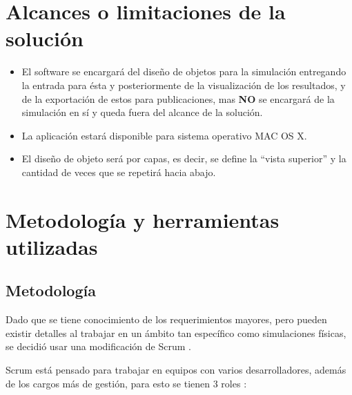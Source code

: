 \section{Alcances o limitaciones de la solución}
\begin{itemize}
	\item El software se encargará del diseño de objetos para la simulación entregando la entrada para ésta y posteriormente de la visualización de los resultados, y de la exportación de estos para publicaciones, mas \textbf{NO} se encargará de la simulación en sí y queda fuera del alcance de la solución.
	\item La aplicación estará disponible para sistema operativo MAC OS X.
	\item El diseño de objeto será por capas, es decir, se define la ``vista superior'' y la cantidad de veces que se repetirá hacia abajo.
\end{itemize}


\section{Metodolog\'ia y herramientas utilizadas}
\label{intro:metodologia}

\subsection{Metodolog\'ia}
Dado que se tiene conocimiento de los requerimientos mayores, pero pueden existir detalles al trabajar en un ámbito tan específico como simulaciones físicas, se decidió usar una modificación de Scrum \citep{SCRUM}.

Scrum está pensado para trabajar en equipos con varios desarrolladores, además de los cargos más de gestión, para esto se tienen 3 roles \citep{website:ScrumRoles}:

